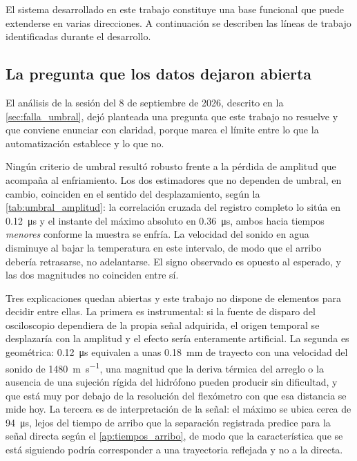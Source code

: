 El sistema desarrollado en este trabajo constituye una base funcional
que puede extenderse en varias direcciones. A continuación se describen
las líneas de trabajo identificadas durante el desarrollo.

\subsection*{La pregunta que los datos dejaron abierta}

El análisis de la sesión del 8 de septiembre de 2026, descrito en la
\cref{sec:falla_umbral}, dejó planteada una pregunta que este trabajo
no resuelve y que conviene enunciar con claridad, porque marca el
límite entre lo que la automatización establece y lo que no.

Ningún criterio de umbral resultó robusto frente a la pérdida de
amplitud que acompaña al enfriamiento. Los dos estimadores que no
dependen de umbral, en cambio, coinciden en el sentido del
desplazamiento, según la \cref{tab:umbral_amplitud}: la correlación
cruzada del registro completo lo sitúa en \SI{0.12}{\micro\second} y el
instante del máximo absoluto en \SI{0.36}{\micro\second}, ambos hacia
tiempos \emph{menores} conforme la muestra se enfría. La velocidad del
sonido en agua disminuye al bajar la temperatura en este intervalo, de
modo que el arribo debería retrasarse, no adelantarse. El signo
observado es opuesto al esperado, y las dos magnitudes no coinciden
entre sí.

Tres explicaciones quedan abiertas y este trabajo no dispone de
elementos para decidir entre ellas. La primera es instrumental: si la
fuente de disparo del osciloscopio dependiera de la propia señal
adquirida, el origen temporal se desplazaría con la amplitud y el
efecto sería enteramente artificial. La segunda es geométrica:
\SI{0.12}{\micro\second} equivalen a unas \SI{0.18}{\milli\meter} de
trayecto con una velocidad del sonido de \SI{1480}{\meter\per\second},
una magnitud que la deriva térmica del arreglo o la ausencia de una
sujeción rígida del hidrófono pueden producir sin dificultad, y que
está muy por debajo de la resolución del flexómetro con que esa
distancia se mide hoy. La tercera es de interpretación de la señal: el
máximo se ubica cerca de \SI{94}{\micro\second}, lejos del tiempo de
arribo que la separación registrada predice para la señal directa según
el \cref{ap:tiempos_arribo}, de modo que la característica que se está
siguiendo podría corresponder a una trayectoria reflejada y no a la
directa.

